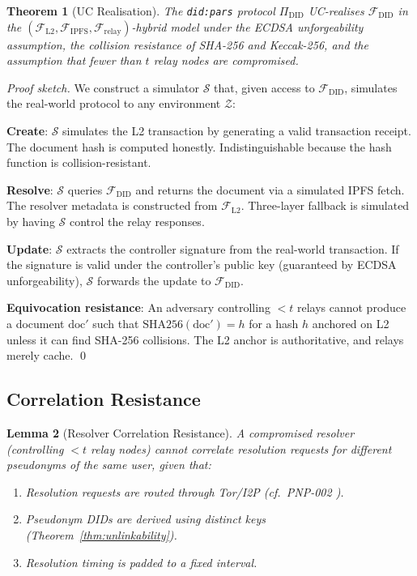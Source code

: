 \documentclass[11pt,a4paper]{article}
\newtheorem{theorem}{Theorem}[section]
\newtheorem{lemma}[theorem]{Lemma}
\begin{document}
\begin{theorem}[UC Realisation]
\label{thm:uc-realisation}
The \texttt{did:pars} protocol $\Pi_{\text{DID}}$ UC-realises $\mathcal{F}_{\text{DID}}$
in the $(\mathcal{F}_{\text{L2}}, \mathcal{F}_{\text{IPFS}}, \mathcal{F}_{\text{relay}})$-hybrid
model under the ECDSA unforgeability assumption, the collision resistance of SHA-256
and Keccak-256, and the assumption that fewer than $t$ relay nodes are compromised.
\end{theorem}

\begin{proof}[Proof sketch]
We construct a simulator $\mathcal{S}$ that, given access to $\mathcal{F}_{\text{DID}}$,
simulates the real-world protocol to any environment $\mathcal{Z}$:

\textbf{Create}: $\mathcal{S}$ simulates the L2 transaction by generating a valid
transaction receipt. The document hash is computed honestly. Indistinguishable because
the hash function is collision-resistant.

\textbf{Resolve}: $\mathcal{S}$ queries $\mathcal{F}_{\text{DID}}$ and returns the
document via a simulated IPFS fetch. The resolver metadata is constructed from
$\mathcal{F}_{\text{L2}}$. Three-layer fallback is simulated by having $\mathcal{S}$
control the relay responses.

\textbf{Update}: $\mathcal{S}$ extracts the controller signature from the real-world
transaction. If the signature is valid under the controller's public key (guaranteed
by ECDSA unforgeability), $\mathcal{S}$ forwards the update to $\mathcal{F}_{\text{DID}}$.

\textbf{Equivocation resistance}: An adversary controlling $< t$ relays cannot
produce a document $\text{doc}'$ such that $\text{SHA256}(\text{doc}') = h$ for a
hash $h$ anchored on L2 unless it can find SHA-256 collisions. The L2 anchor is
authoritative, and relays merely cache. \qed
\end{proof}

\subsection{Correlation Resistance}

\begin{lemma}[Resolver Correlation Resistance]
A compromised resolver (controlling $< t$ relay nodes) cannot correlate resolution
requests for different pseudonyms of the same user, given that:
\begin{enumerate}[label=(\roman*)]
    \item Resolution requests are routed through Tor/I2P (cf.\ PNP-002 \cite{pnp002}).
    \item Pseudonym DIDs are derived using distinct keys (Theorem~\ref{thm:unlinkability}).
    \item Resolution timing is padded to a fixed interval.
\end{enumerate}
\end{lemma}
\end{document}
